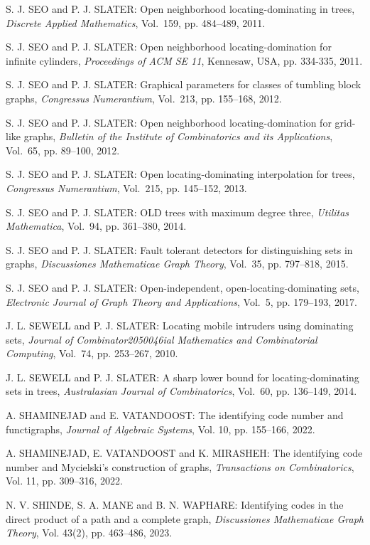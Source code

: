 \begin{thebibliography}{999}
S. J. SEO and P. J. SLATER: Open neighborhood locating-dominating in trees, {\it Discrete Applied Mathematics}, Vol.~159, pp. 484--489, 2011. 

S. J. SEO and P. J. SLATER: Open neighborhood locating-domination for infinite cylinders, {\it Proceedings of ACM SE 11}, Kennesaw, USA, pp. 334-335, 2011.

S. J. SEO and P. J. SLATER: Graphical parameters for classes of tumbling block graphs, {\it Congressus Numerantium}, Vol.~213, pp. 155--168, 2012.

S. J. SEO and P. J. SLATER: Open neighborhood locating-domination for grid-like graphs, {\it Bulletin of the Institute of Combinatorics and its Applications}, Vol.~65, pp. 89--100, 2012.

S. J. SEO and P. J. SLATER: Open locating-dominating interpolation for trees, {\it Congressus Numerantium}, Vol.~215, pp. 145--152, 2013.

S. J. SEO and P. J. SLATER: OLD trees with maximum degree three, {\it Utilitas Mathematica}, Vol.~94, pp. 361--380, 2014.

S. J. SEO and P. J. SLATER: Fault tolerant detectors for distinguishing sets in graphs, {\it Discussiones Mathematicae Graph Theory}, Vol.~35, pp. 797--818, 2015. 
  
S. J. SEO and P. J. SLATER: Open-independent, open-locating-dominating sets, {\it Electronic Journal of Graph Theory and Applications}, Vol.~5, pp. 179--193, 2017.

J. L. SEWELL and P. J. SLATER: Locating mobile intruders using dominating sets, {\it Journal of Combinator2050046ial Mathematics and Combinatorial Computing}, Vol.~74, pp. 253--267, 2010.

J. L. SEWELL and P. J. SLATER: A sharp lower bound for locating-dominating sets in trees, {\it Australasian Journal of Combinatorics}, Vol.~60, pp. 136--149, 2014.

A. SHAMINEJAD and E. VATANDOOST: The identifying code number and functigraphs, {\it Journal of Algebraic Systems}, Vol. 10, pp. 155--166, 2022.

A. SHAMINEJAD, E. VATANDOOST and K. MIRASHEH: The identifying code number and Mycielski's construction of graphs, {\it Transactions on Combinatorics}, Vol. 11, pp. 309--316, 2022.

N. V. SHINDE, S. A. MANE and B. N. WAPHARE: Identifying codes in the direct product of a path and a complete graph, {\it Discussiones Mathematicae Graph Theory}, Vol. 43(2), pp. 463--486, 2023.


\end{thebibliography}
